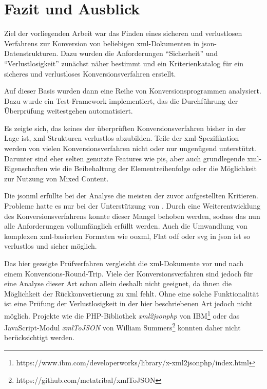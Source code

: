 \chapter{Fazit und Ausblick} \label{chap:conclusion}
Ziel der vorliegenden Arbeit war das Finden eines sicheren und verlustlosen Verfahrens zur Konversion von beliebigen \acrshort{xml}-Dokumenten in \acrshort{json}-Datenstrukturen. Dazu wurden die Anforderungen \enquote{Sicherheit} und \enquote{Verlustlosigkeit} zunächst näher bestimmt und ein Kriterienkatalog für ein sicheres und verlustloses Konversionsverfahren erstellt.

Auf dieser Basis wurden dann eine Reihe von Konversionsprogrammen analysiert. Dazu wurde ein Test-Framework implementiert, das die Durchführung der Überprüfung weitestgehen automatisiert.

Es zeigte sich, das keines der überprüften Konversionsverfahren bisher in der Lage ist, \acrshort{xml}-Strukturen verlustlos abzubilden. Teile der \acrshort{xml}-Spezifikation werden von vielen Konversionsverfahren nicht oder nur ungenügend unterstützt. Darunter sind eher selten genutzte Features wie \glspl{pi}, aber auch grundlegende \acrshort{xml}-Eigenschaften wie die Beibehaltung der Elementreihenfolge oder die Möglichkeit zur Nutzung von Mixed Content.

Die \acrfull{jsonml} erfüllte bei der Analyse die meisten der zuvor aufgestellten Kritieren. Probleme hatte es nur bei der Unterstützung von . Durch eine Weiterentwicklung des Konversionsverfahrens konnte dieser Mangel behoben werden, sodass das nun alle Anforderungen vollumfänglich erfüllt werden. Auch die Umwandlung von komplexen \acrshort{xml}-basierten Formaten wie \gls{ooxml}, Flat \gls{odf} oder \gls{svg} in \acrshort{json} ist so verlustlos und sicher möglich.

Das hier gezeigte Prüfverfahren vergleicht die \acrshort{xml}-Dokumente vor und nach einem Konversions-Round-Trip. Viele der Konversionsverfahren sind jedoch für eine Analyse dieser Art schon allein deshalb nicht geeignet, da ihnen die Möglichkeit der Rückkonvertierung zu \acrshort{xml} fehlt. Ohne eine solche Funktionalität ist eine Prüfung der Verlustlosigkeit in der hier beschriebenen Art jedoch nicht möglich. Projekte wie die PHP-Bibliothek \emph{xml2jsonphp} von IBM\footnote{https://www.ibm.com/developerworks/library/x-xml2jsonphp/index.html} oder das JavaScript-Modul \emph{xmlToJSON} von William Summers\footnote{https://github.com/metatribal/xmlToJSON} konnten daher nicht berücksichtigt werden.

